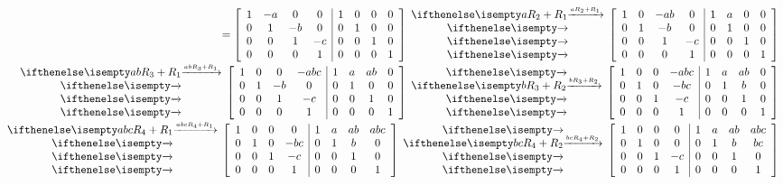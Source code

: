 \documentclass[
  letterpaper,
  DIV=11,
  numbers=noendperiod]{scrartcl}
\begin{document}
\begin{align*}
[A \ \ I] = \left[\begin{array}{cccc|cccc}
1 & -a & 0 & 0 & 1 & 0 & 0 & 0 \\
0 & 1 & -b & 0 & 0 & 1 & 0 & 0 \\
0 & 0 & 1 & -c & 0 & 0 & 1 & 0 \\
0 & 0 & 0 & 1 & 0 & 0 & 0 & 1
\end{array}\right]
\rowops{aR_2+R_1,,,}
\left[\begin{array}{cccc|cccc}
1 & 0 & -ab & 0 & 1 & a & 0 & 0 \\
0 & 1 & -b & 0 & 0 & 1 & 0 & 0 \\
0 & 0 & 1 & -c & 0 & 0 & 1 & 0 \\
0 & 0 & 0 & 1 & 0 & 0 & 0 & 1
\end{array}\right] &\\
\rowops{abR_3+R_1,,,}
\left[\begin{array}{cccc|cccc}
1 & 0 & 0 & -abc & 1 & a & ab & 0 \\
0 & 1 & -b & 0 & 0 & 1 & 0 & 0 \\
0 & 0 & 1 & -c & 0 & 0 & 1 & 0 \\
0 & 0 & 0 & 1 & 0 & 0 & 0 & 1
\end{array}\right]
\rowops{,bR_3+R_2,,}
\left[\begin{array}{cccc|cccc}
1 & 0 & 0 & -abc & 1 & a & ab & 0 \\
0 & 1 & 0 & -bc & 0 & 1 & b & 0 \\
0 & 0 & 1 & -c & 0 & 0 & 1 & 0 \\
0 & 0 & 0 & 1 & 0 & 0 & 0 & 1
\end{array}\right] &\\
\rowops{abcR_4+R_1,,,}
\left[\begin{array}{cccc|cccc}
1 & 0 & 0 & 0 & 1 & a & ab & abc \\
0 & 1 & 0 & -bc & 0 & 1 & b & 0 \\
0 & 0 & 1 & -c & 0 & 0 & 1 & 0 \\
0 & 0 & 0 & 1 & 0 & 0 & 0 & 1
\end{array}\right]
\rowops{,bcR_4+R_2,,}
\left[\begin{array}{cccc|cccc}
1 & 0 & 0 & 0 & 1 & a & ab & abc \\
0 & 1 & 0 & 0 & 0 & 1 & b & bc \\
0 & 0 & 1 & -c & 0 & 0 & 1 & 0 \\
0 & 0 & 0 & 1 & 0 & 0 & 0 & 1
\end{array}\right] &\\

\end{align*}
\end{document}
